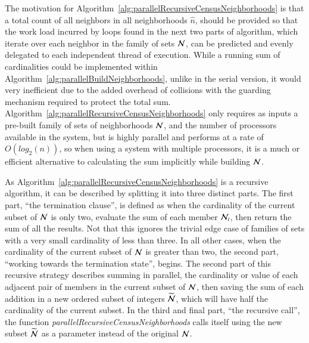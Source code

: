 The motivation for Algorithm~\ref{alg:parallelRecursiveCensusNeighborhoods} is that a total count of all neighbors in all neighborhoods $\hat{n}$, should be provided so that the work load incurred by loops found in the next two parts of  algorithm, which iterate over each neighbor in the family of sets $\mathcal{N}$, can be predicted and evenly delegated to each independent thread of execution. While a running sum of cardinalities could be implemented within Algorithm~\ref{alg:parallelBuildNeighborhoods}, unlike in the serial version, it would very inefficient due to the added overhead of collisions with the guarding mechanism required to protect the total sum.  Algorithm~\ref{alg:parallelRecursiveCensusNeighborhoods} only requires as inputs a pre-built family of sets of neighborhoods $\mathcal{N}$, and the number of processors available in the system, but is highly parallel and performs at a rate of $O(log_2(n))$, so when using a system with multiple processors, it is a much or efficient alternative to calculating the sum implicitly while building $\mathcal{N}$.

As Algorithm~\ref{alg:parallelRecursiveCensusNeighborhoods} is a recursive algorithm, it can be described by splitting it into three distinct parts. The first part, ``the termination clause'', is defined as when the cardinality of the current subset of $\mathcal{N}$ is only two, evaluate the sum of each member $\mathcal{N}_i$, then return the sum of all the results. Not that this ignores the trivial edge case of families of sets with a very small cardinality of less than three. In all other cases, when the cardinality of the current subset of $\mathcal{N}$ is greater than two, the second part, ``working towards the termination state'', begins. The second part of this recursive strategy describes summing in parallel, the cardinality or value of each adjacent pair of members in the current subset of $\mathcal{N}$, then saving the sum of each addition in a new ordered subset of integers $\widetilde{\mathcal{N}}$, which will have half the cardinality of the current subset. In the third and final part, ``the recursive call'', the function \textit{parallelRecursiveCensusNeighborhoods} calls itself using the new subset $\widetilde{\mathcal{N}}$ as a parameter instead of the original $\mathcal{N}$.

